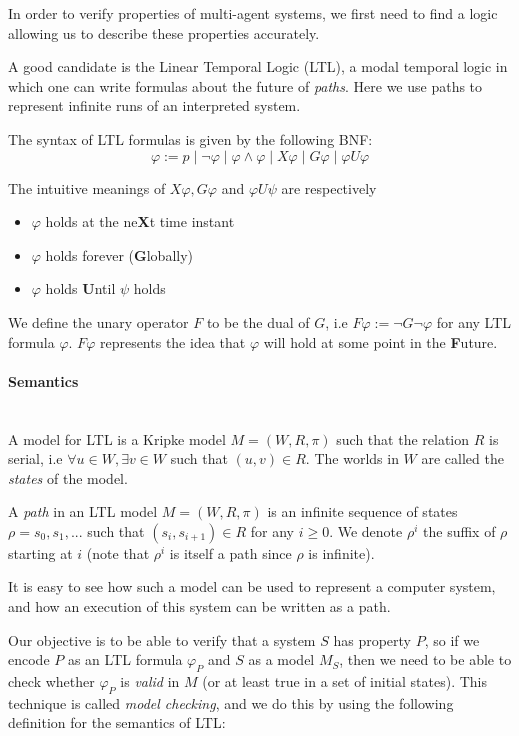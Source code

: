 \documentclass[11pt]{article}
\newenvironment{definition}[1][Definition]{\begin{trivlist}
\item[\hskip \labelsep {\bfseries #1}]}{\end{trivlist}}
\newcommand{\myparagraph}[1]{\paragraph{#1}\mbox{}\\}
\begin{document}
In order to verify properties of multi-agent systems, we first need to find a logic allowing us to describe these properties accurately. 

A good candidate is the Linear Temporal Logic (LTL), a modal temporal logic in which one can write formulas about the future of \emph{paths}. Here we use paths to represent infinite runs of an interpreted system. 

\begin{definition} 
The syntax of LTL formulas is given by the following BNF: 
$$\varphi := p \mid \lnot\varphi \mid \varphi \land \varphi \mid X\varphi \mid G\varphi \mid \varphi U\varphi$$
\end{definition}

The intuitive meanings of $X\varphi, G\varphi$ and $\varphi U\psi$ are respectively 
\begin{itemize} 
\item $\varphi$ holds at the ne\textbf{X}t time instant
\item $\varphi$ holds forever (\textbf{G}lobally)
\item $\varphi$ holds \textbf{U}ntil $\psi$ holds  
\end{itemize}

We define the unary operator $F$ to be the dual of $G$, i.e $F\varphi := \lnot G\lnot\varphi$ for any LTL formula $\varphi$. $F\varphi$ represents the idea that $\varphi$ will hold at some point in the \textbf{F}uture.   

\myparagraph{Semantics} 

A model for LTL is a Kripke model $M = (W, R, \pi)$ such that the relation $R$ is serial, i.e $\forall u \in W,  \exists v \in W$ such that $(u, v) \in R$.
The worlds in $W$ are called the \textit{states} of the model. 

\begin{definition} 
A \textit{path} in an LTL model $M = (W, R, \pi)$ is an infinite sequence of states $\rho = s_0, s_1, ...$ such that $(s_i, s_{i+1}) \in R$ for any $i \geq 0$.
We denote $\rho^i$ the suffix of $\rho$ starting at $i$ (note that $\rho^i$ is itself a path since $\rho$ is infinite).
\end{definition}

It is easy to see how such a model can be used to represent a computer system, and how an execution of this system can be written as a path.

 Our objective is to be able to verify that a system $S$ has property $P$, so if we encode $P$ as an LTL formula $\varphi_P$ and $S$ as a model $M_S$, then we need to be able to check whether $\varphi_P$ is \textit{valid} in $M$ (or at least true in a set of initial states). This technique is called \textit{model checking}, and we do this by using the following definition for the semantics of LTL:
\label{model_checking}
\end{document}
